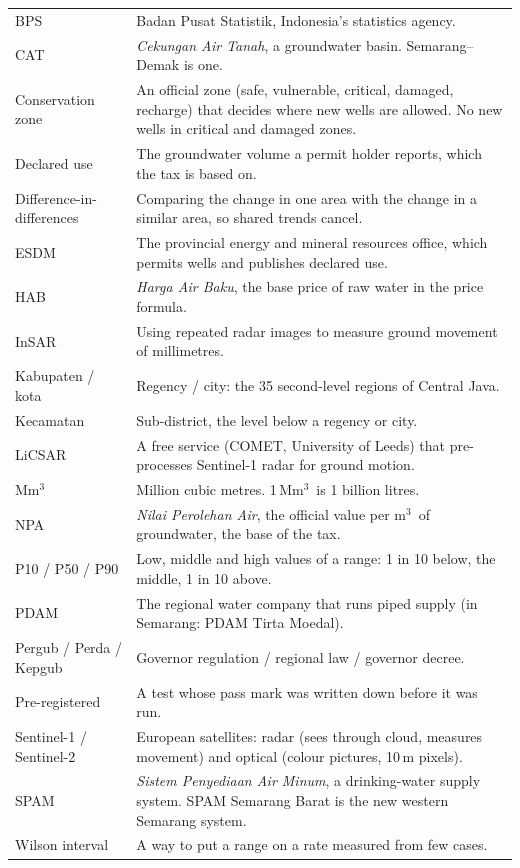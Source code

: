\documentclass[11pt,a4paper]{article}
\newcommand{\Mm}{\,Mm$^{3}$}
\newcommand{\mthree}{m$^{3}$}
\begin{document}
{\small
\begin{xltabular}{\linewidth}{@{}L{34mm}Y@{}}
\toprule
\endhead
BPS & Badan Pusat Statistik, Indonesia's statistics agency.\\
CAT & \emph{Cekungan Air Tanah}, a groundwater basin. Semarang--Demak is one.\\
Conservation zone & An official zone (safe, vulnerable, critical, damaged, recharge) that decides where new
  wells are allowed. No new wells in critical and damaged zones.\\
Declared use & The groundwater volume a permit holder reports, which the tax is based on.\\
Difference-in-differences & Comparing the change in one area with the change in a similar area, so shared
  trends cancel.\\
ESDM & The provincial energy and mineral resources office, which permits wells and publishes declared use.\\
HAB & \emph{Harga Air Baku}, the base price of raw water in the price formula.\\
InSAR & Using repeated radar images to measure ground movement of millimetres.\\
Kabupaten / kota & Regency / city: the 35 second-level regions of Central Java.\\
Kecamatan & Sub-district, the level below a regency or city.\\
LiCSAR & A free service (COMET, University of Leeds) that pre-processes Sentinel-1 radar for ground motion.\\
Mm$^3$ & Million cubic metres. 1\Mm\ is 1 billion litres.\\
NPA & \emph{Nilai Perolehan Air}, the official value per \mthree\ of groundwater, the base of the tax.\\
P10 / P50 / P90 & Low, middle and high values of a range: 1 in 10 below, the middle, 1 in 10 above.\\
PDAM & The regional water company that runs piped supply (in Semarang: PDAM Tirta Moedal).\\
Pergub / Perda / Kepgub & Governor regulation / regional law / governor decree.\\
Pre-registered & A test whose pass mark was written down before it was run.\\
Sentinel-1 / Sentinel-2 & European satellites: radar (sees through cloud, measures movement) and optical
  (colour pictures, 10\,m pixels).\\
SPAM & \emph{Sistem Penyediaan Air Minum}, a drinking-water supply system. SPAM Semarang Barat is the new
  western Semarang system.\\
Wilson interval & A way to put a range on a rate measured from few cases.\\
\bottomrule
\end{xltabular}}
\end{document}
